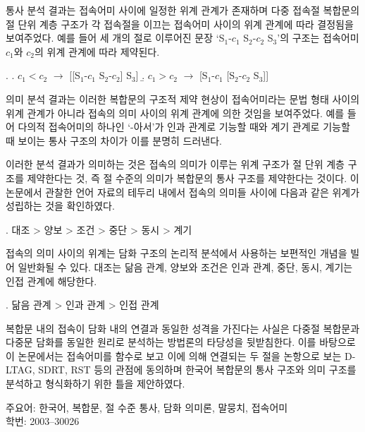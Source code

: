 \begin{summary}
통사 분석 결과는 접속어미 사이에 일정한 위계 관계가 존재하며 다중 접속절
복합문의 절 단위 계층 구조가 각 접속절을 이끄는 접속어미 사이의 위계 관계에
따라 결정됨을 보여주었다. 예를 들어 세 개의 절로 이루어진 문장 `S$_1$-$c_1$
S$_2$-$c_2$ S$_3$'의 구조는 접속어미 $c_1$와 $c_2$의 위계 관계에 따라
제약된다.

\ex.
\a. $c_1 < c_2$ $\rightarrow$ [[S$_1$-$c_1$ S$_2$-$c_2$] S$_3$]
\b. $c_1 > c_2$ $\rightarrow$ [S$_1$-$c_1$ [S$_2$-$c_2$ S$_3$]]


의미 분석 결과는 이러한 복합문의 구조적 제약 현상이 접속어미라는 문법 형태
사이의 위계 관계가 아니라 접속의 의미 사이의 위계 관계에 의한 것임을
보여주었다. 예를 들어 다의적 접속어미의 하나인 `-아서'가 인과 관계로 기능할
때와 계기 관계로 기능할 때 보이는 통사 구조의 차이가 이를 분명히 드러낸다.
 
이러한 분석 결과가 의미하는 것은 접속의 의미가 이루는 위계 구조가 절 단위 계층
구조를 제약한다는 것, 즉 절 수준의 의미가 복합문의 통사 구조를 제약한다는 것이다.
이 논문에서 관찰한 언어 자료의 테두리 내에서 접속의 의미들
사이에 다음과 같은 위계가 성립하는 것을 확인하였다.

\ex. 대조 > 양보 > 조건 > 중단 > 동시 > 계기

접속의 의미 사이의 위계는 담화 구조의 논리적 분석에서 사용하는 보편적인 개념을
빌어 일반화될 수 있다. 대조는 닮음 관계, 양보와 조건은 인과 관계, 중단, 동시,
계기는 인접 관계에 해당한다.


\ex. 닮음 관계 > 인과 관계 > 인접 관계


%
%


복합문 내의 접속이 담화 내의 연결과 동일한 성격을 가진다는 사실은 다중절
복합문과 다중문 담화를 동일한 원리로 분석하는 방법론의 타당성을 뒷받침한다.
이를 바탕으로 이 논문에서는 접속어미를 함수로 보고 이에 의해 연결되는 두
절을 논항으로 보는 D-LTAG, SDRT, RST 등의 관점에 동의하며 한국어 복합문의 통사
구조와 의미 구조를 분석하고 형식화하기 위한 틀을 제안하였다.

\vfill

\bigskip
\noindent
주요어: 한국어, 복합문, 절 수준 통사, 담화 의미론, 말뭉치, 접속어미\\
학\hspace{11pt}번: 2003--30026

\end{summary}



